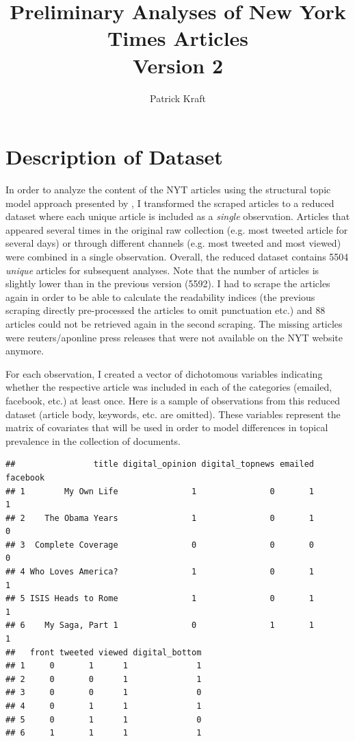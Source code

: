 \documentclass[12pt]{article}\usepackage[]{graphicx}\usepackage[]{color}
\title{Preliminary Analyses of New York Times Articles\\\large{Version 2}}
\author{Patrick Kraft}
\makeatletter
\newenvironment{kframe}{%
 \def\at@end@of@kframe{}%
 \ifinner\ifhmode%
  \def\at@end@of@kframe{\end{minipage}}%
  \begin{minipage}{\columnwidth}%
 \fi\fi%
 \def\FrameCommand##1{\hskip\@totalleftmargin \hskip-\fboxsep
 \colorbox{shadecolor}{##1}\hskip-\fboxsep
     \hskip-\linewidth \hskip-\@totalleftmargin \hskip\columnwidth}%
 \MakeFramed {\advance\hsize-\width
   \@totalleftmargin\z@ \linewidth\hsize
   \@setminipage}}%
 {\par\unskip\endMakeFramed%
 \at@end@of@kframe}
\newenvironment{knitrout}{}{} %
\makeatother
\begin{document}
\maketitle




\section{Description of Dataset}

In order to analyze the content of the NYT articles using the structural topic model approach presented by \citet{roberts2014structural}, I transformed the scraped articles to a reduced dataset where each unique article is included as a \textit{single} observation. Articles that appeared several times in the original raw collection (e.g. most tweeted article for several days) or through different channels (e.g. most tweeted and most viewed) were combined in a single observation. Overall, the reduced dataset contains 5504 \textit{unique} articles for subsequent analyses. Note that the number of articles is slightly lower than in the previous version (5592). I had to scrape the articles again in order to be able to calculate the readability indices (the previous scraping directly pre-processed the articles to omit punctuation etc.) and 88 articles could not be retrieved again in the second scraping. The missing articles were reuters/aponline press releases that were not available on the NYT website anymore.

For each observation, I created a vector of dichotomous variables indicating whether the respective article was included in each of the categories (emailed, facebook, etc.) at least once. Here is a sample of observations from this reduced dataset (article body, keywords, etc. are omitted). These variables represent the matrix of covariates that will be used in order to model differences in topical prevalence in the collection of documents.

\begin{knitrout}
\color{fgcolor}\begin{kframe}
\begin{verbatim}
##                title digital_opinion digital_topnews emailed facebook
## 1        My Own Life               1               0       1        1
## 2    The Obama Years               1               0       1        0
## 3  Complete Coverage               0               0       0        0
## 4 Who Loves America?               1               0       1        1
## 5 ISIS Heads to Rome               1               0       1        1
## 6    My Saga, Part 1               0               1       1        1
##   front tweeted viewed digital_bottom
## 1     0       1      1              1
## 2     0       0      1              1
## 3     0       0      1              0
## 4     0       1      1              1
## 5     0       1      1              0
## 6     1       1      1              1
\end{verbatim}
\end{kframe}
\end{knitrout}
\end{document}
